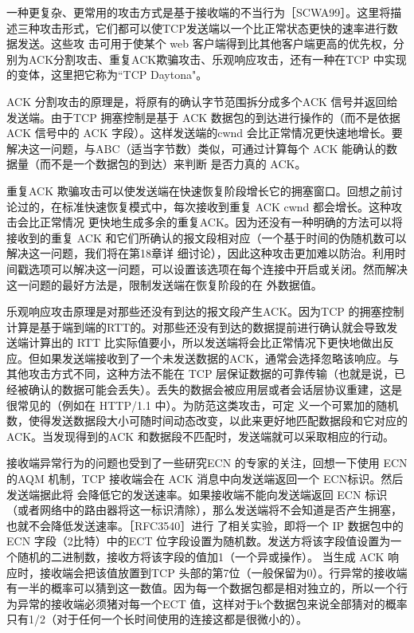 一种更复杂、更常用的攻击方式是基于接收端的不当行为［SCWA99］。这里将描述三种攻击形式，它们都可以使TCP发送端以一个比正常状态更快的速率进行数据发送。这些攻
击可用于使某个 web 客户端得到比其他客户端更高的优先权，分别为ACK分割攻击、重复ACK欺骗攻击、乐观响应攻击，还有一种在TCP 中实现的变体，这里把它称为“TCP
Daytona"。

ACK 分割攻击的原理是，将原有的确认字节范围拆分成多个ACK 信号并返回给发送端。由于TCP 拥塞控制是基于 ACK 数据包的到达进行操作的（而不是依据ACK 信号中的
ACK 字段）。这样发送端的cwnd 会比正常情况更快速地增长。要解决这一问题，与ABC（适当字节数）类似，可通过计算每个 ACK 能确认的数据量（而不是一个数据包的到达）来判断
是否力真的 ACK。

重复ACK 欺骗攻击可以使发送端在快速恢复阶段增长它的拥塞窗口。回想之前讨论过的，在标准快速恢复模式中，每次接收到重复 ACK cwnd 都会增长。这种攻击会比正常情况
更快地生成多余的重复ACK。因为还没有一种明确的方法可以将接收到的重复 ACK 和它们所确认的报文段相对应（一个基于时间的伪随机数可以解决这一问题，我们将在第18章详
细讨论），因此这种攻击更加难以防治。利用时间戳选项可以解决这一问题，可以设置该选项在每个连接中开启或关闭。然而解决这一问题的最好方法是，限制发送端在恢复阶段的在
外数据值。

乐观响应攻击原理是对那些还没有到达的报文段产生ACK。因为TCP 的拥塞控制计算是基于端到端的RTT的。对那些还没有到达的数据提前进行确认就会导致发送端计算出的
RTT 比实际值要小，所以发送端将会比正常情况下更快地做出反应。但如果发送端接收到了一个未发送数据的ACK，通常会选择忽略该响应。与其他攻击方式不同，这种方法不能在
TCP 层保证数据的可靠传输（也就是说，已经被确认的数据可能会丢失）。丢失的数据会被应用层或者会话层协议重建，这是很常见的（例如在 HTTP/1.1 中）。为防范这类攻击，可定
义一个可累加的随机数，使得发送数据段大小可随时间动态改变，以此来更好地匹配数据段和它对应的ACK。当发现得到的ACK 和数据段不匹配时，发送端就可以采取相应的行动。

接收端异常行为的问题也受到了一些研究ECN 的专家的关注，回想一下使用 ECN的AQM 机制，TCP 接收端会在 ACK 消息中向发送端返回一个 ECN标识。然后发送端据此将
会降低它的发送速率。如果接收端不能向发送端返回 ECN 标识（或者网络中的路由器将这一标识清除），那么发送端将不会知道是否产生拥塞，也就不会降低发送速率。［RFC3540］进行
了相关实验，即将一个 IP 数据包中的ECN 字段（2比特）中的ECT 位字段设置为随机数。发送方将该字段值设置为一个随机的二进制数，接收方将该字段的值加1（一个异或操作）。
当生成 ACK 响应时，接收端会把该值放置到TCP 头部的第7位（一般保留为0）。行异常的接收端有一半的概率可以猜到这一数值。因为每一个数据包都是相对独立的，所以一个行
为异常的接收端必须猪对每一个ECT 值，这样对于k个数据包来说全部猜对的概率只有1/2（对于任何一个长时间使用的连接这都是很微小的）。

